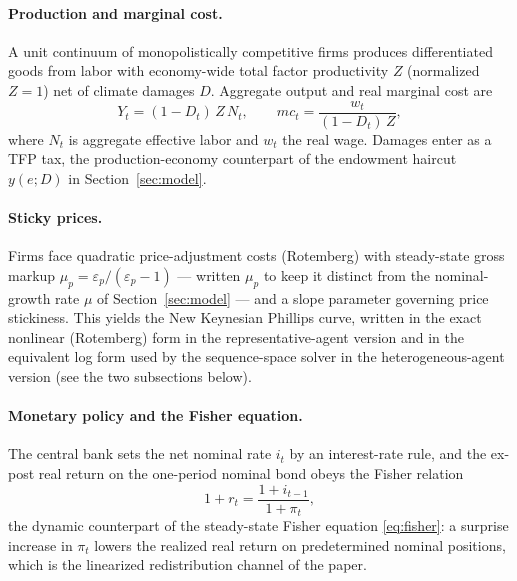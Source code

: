 \documentclass[12pt]{article}
\begin{document}
\paragraph{Production and marginal cost.} A unit continuum of
monopolistically competitive firms produces differentiated goods from labor
with economy-wide total factor productivity $Z$ (normalized $Z=1$) net of
climate damages $D$. Aggregate output and real marginal cost are
\begin{equation}
Y_t = (1-D_t)\,Z\,N_t, \qquad
mc_t = \frac{w_t}{(1-D_t)\,Z},
\label{eq:nk-production}
\end{equation}
where $N_t$ is aggregate effective labor and $w_t$ the real wage. Damages
enter as a TFP tax, the production-economy counterpart of the endowment
haircut $y(e;D)$ in Section~\ref{sec:model}.

\paragraph{Sticky prices.} Firms face quadratic price-adjustment costs
(Rotemberg) with steady-state gross markup
$\mu_p=\varepsilon_p/(\varepsilon_p-1)$ --- written $\mu_p$ to keep it
distinct from the nominal-growth rate $\mu$ of Section~\ref{sec:model} ---
and a slope parameter governing price stickiness. This yields the New
Keynesian Phillips curve, written in the exact nonlinear (Rotemberg) form
in the representative-agent version and in the equivalent log form used by
the sequence-space solver in the heterogeneous-agent version (see the two
subsections below).

\paragraph{Monetary policy and the Fisher equation.} The central bank sets
the net nominal rate $i_t$ by an interest-rate rule, and the ex-post real
return on the one-period nominal bond obeys the Fisher relation
\begin{equation}
1 + r_t = \frac{1+i_{t-1}}{1+\pi_t},
\label{eq:nk-fisher}
\end{equation}
the dynamic counterpart of the steady-state Fisher equation
\eqref{eq:fisher}: a surprise increase in $\pi_t$ lowers the realized real
return on predetermined nominal positions, which is the linearized
redistribution channel of the paper.
\end{document}
